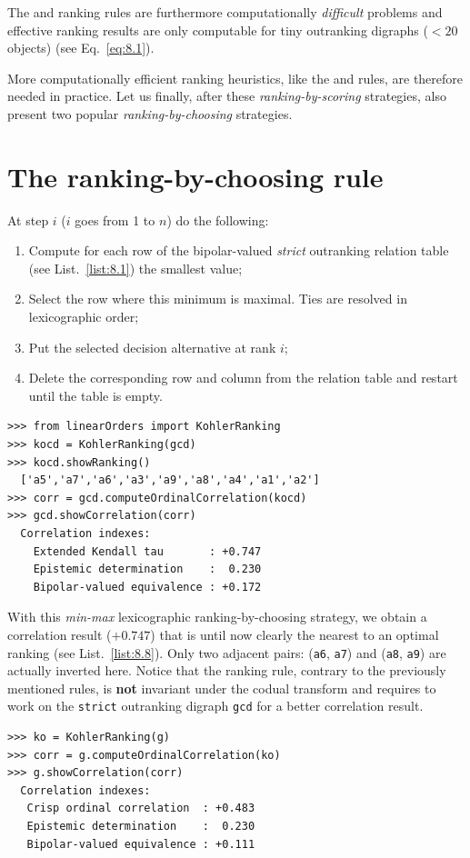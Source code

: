 The \Kemeny and \Slater ranking rules are furthermore computationally \emph{difficult} problems and effective ranking results are only computable for tiny outranking digraphs ($< 20$ objects) (see Eq.~\vref{eq:8.1}). 

More computationally efficient ranking heuristics, like the \Copeland and \NetFlows rules, are therefore needed in practice. Let us finally, after these \emph{ranking-by-scoring} strategies, also present two popular \emph{ranking-by-choosing} strategies.

\section{The \Kohler ranking-by-choosing rule}
\label{sec:8.6}

\begin{definition}\label{def:8.4}
  
\noindent At step $i$ ($i$ goes from 1 to $n$) do the following:
\begin{enumerate}[leftmargin=0.5cm,rightmargin=0.5cm,topsep=1pt]
\item Compute for each row of the bipolar-valued \emph{strict} outranking relation table (see List.~\vref{list:8.1}) the smallest value;
\item Select the row where this minimum is maximal. Ties are resolved in lexicographic order;
\item Put the selected decision alternative at rank $i$;
\item Delete the corresponding row and column from the relation table and restart until the table is empty.
\end{enumerate}
\end{definition}
\begin{lstlisting}[caption={Computing a \Kohler ranking},label=list:8.14]   
>>> from linearOrders import KohlerRanking
>>> kocd = KohlerRanking(gcd)
>>> kocd.showRanking()
  ['a5','a7','a6','a3','a9','a8','a4','a1','a2']
>>> corr = gcd.computeOrdinalCorrelation(kocd)
>>> gcd.showCorrelation(corr)
  Correlation indexes:
    Extended Kendall tau       : +0.747
    Epistemic determination    :  0.230
    Bipolar-valued equivalence : +0.172
\end{lstlisting}

With this \emph{min-max} lexicographic ranking-by-choosing strategy, we obtain a correlation result ($+0.747$) that is until now clearly the nearest to an optimal \Kemeny ranking (see List.~\vref{list:8.8}). Only two adjacent pairs: (\texttt{a6}, \texttt{a7}) and (\texttt{a8}, \texttt{a9}) are actually inverted here. Notice that the \Kohler ranking rule, contrary to the previously mentioned rules, is \textbf{not} invariant under the codual transform and requires to work on the \texttt{strict} outranking digraph \texttt{gcd} for a better correlation result.
\begin{lstlisting}
>>> ko = KohlerRanking(g)  
>>> corr = g.computeOrdinalCorrelation(ko)
>>> g.showCorrelation(corr)
  Correlation indexes:
   Crisp ordinal correlation  : +0.483
   Epistemic determination    :  0.230
   Bipolar-valued equivalence : +0.111
\end{lstlisting}

